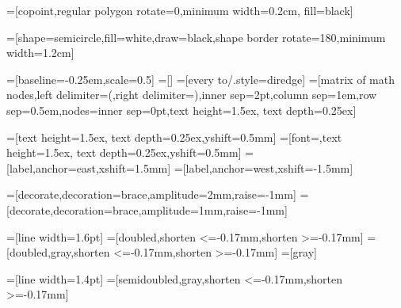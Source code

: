 =[copoint,regular polygon rotate=0,minimum width=0.2cm, fill=black]

=[shape=semicircle,fill=white,draw=black,shape border rotate=180,minimum width=1.2cm]

%
%


=[baseline=-0.25em,scale=0.5]
=[] %
=[every to/.style={diredge}]
=[matrix of math nodes,left delimiter=(,right delimiter=),inner sep=2pt,column sep=1em,row sep=0.5em,nodes={inner sep=0pt},text height=1.5ex, text depth=0.25ex]


=[text height=1.5ex, text depth=0.25ex,yshift=0.5mm]
=[font=\footnotesize,text height=1.5ex, text depth=0.25ex,yshift=0.5mm]
=[label,anchor=east,xshift=1.5mm]
=[label,anchor=west,xshift=-1.5mm]

\newcommand{\phantombox}[1]{\tikz[baseline=(current bounding box).east]{\path [use as bounding box] (0,0) rectangle #1;}}
=[decorate,decoration={brace,amplitude=2mm,raise=-1mm}]
=[decorate,decoration={brace,amplitude=1mm,raise=-1mm}]

=[line width=1.6pt] %
=[doubled,shorten <=-0.17mm,shorten >=-0.17mm]
=[doubled,gray,shorten <=-0.17mm,shorten >=-0.17mm]
=[gray]%

=[line width=1.4pt] %
=[semidoubled,gray,shorten <=-0.17mm,shorten >=-0.17mm]

